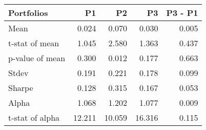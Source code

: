 \begin{tabular}{lrrrr}
\toprule
Portfolios & P1 & P2 & P3 & P3 - P1 \\
\midrule
Mean & 0.024 & 0.070 & 0.030 & 0.005 \\
t-stat of mean & 1.045 & 2.580 & 1.363 & 0.437 \\
p-value of mean & 0.300 & 0.012 & 0.177 & 0.663 \\
Stdev & 0.191 & 0.221 & 0.178 & 0.099 \\
Sharpe & 0.128 & 0.315 & 0.167 & 0.053 \\
Alpha & 1.068 & 1.202 & 1.077 & 0.009 \\
t-stat of alpha & 12.211 & 10.059 & 16.316 & 0.115 \\
\bottomrule
\end{tabular}
